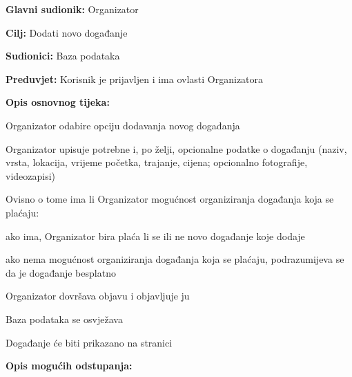 					\noindent {}
					\begin{packed_item}
						
						\item \textbf{Glavni sudionik:} Organizator
						\item  \textbf{Cilj:} Dodati novo događanje 
						\item  \textbf{Sudionici:} Baza podataka
						\item  \textbf{Preduvjet:} Korisnik je prijavljen i ima ovlasti Organizatora
						\item  \textbf{Opis osnovnog tijeka:}
						
						\item[] \begin{packed_enum}
							
							\item Organizator odabire opciju dodavanja novog događanja
							\item Organizator upisuje potrebne i, po želji, opcionalne podatke o događanju (naziv, vrsta, lokacija, vrijeme početka, trajanje, cijena; opcionalno fotografije, videozapisi)
							
							\item Ovisno o tome ima li Organizator mogućnost organiziranja događanja koja se plaćaju: 
							\item[] \begin{packed_enum}
								\item ako ima, Organizator bira plaća li se ili ne novo događanje koje dodaje 
								\item ako nema mogućnost organiziranja događanja koja se plaćaju, podrazumijeva se da je događanje besplatno
							\end{packed_enum}
							
							\item Organizator dovršava objavu i objavljuje ju
							\item Baza podataka se osvježava
							\item Događanje će biti prikazano na stranici
							
							\end{packed_enum}
							
							\item  \textbf{Opis mogućih odstupanja:}
							
							\item[] \begin{packed_item}
								

\end{packed_item}
\end{packed_item}
